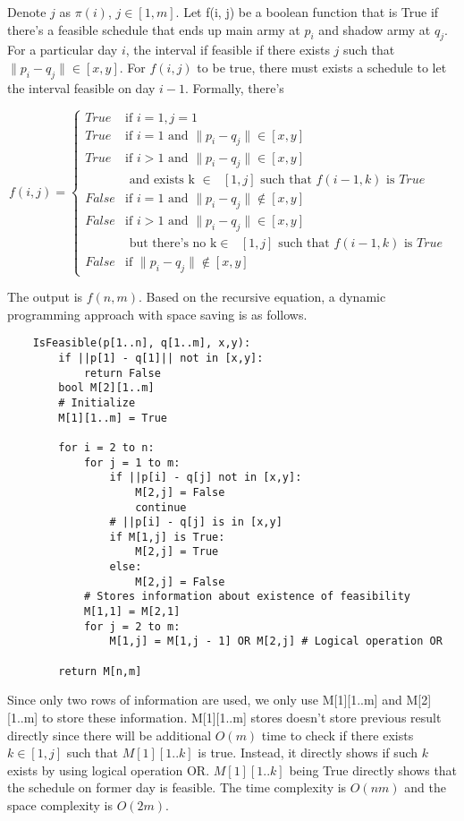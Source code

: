 \documentclass[12pt,a4paper]{article}
\newcommand{\question}[1]{\bigskip\noindent{\textbf{Q{#1} solution}}}
\begin{document}
\question{21.A}

Denote $j$ as $\pi(i)$, $j \in [1,m]$. Let f(i, j) be a boolean function that is True if there's a feasible schedule that ends up main army at $p_i$ and shadow army at $q_j$. For a particular day $i$, the interval if feasible if there exists $j$ such that $\|p_i - q_j\| \in [x,y]$. For $f(i,j)$ to be true, there must exists a schedule to let the interval feasible on day $i - 1$. Formally, there's 

\begin{equation*}
f(i, j) = 
	\begin{cases}
	True & \mbox{if } i = 1, j = 1 \\
	True & \mbox{if } i = 1 \mbox{ and } \|p_i - q_j\| \in [x,y] \\
	True & \mbox{if } i > 1 \mbox{ and }\|p_i - q_j\| \in [x,y] \\
		& \mbox{ and exists k $\in$ $[1,j]$ such that $f(i - 1, k)$ is $True$} \\
	False & \mbox{if } i = 1 \mbox{ and } \|p_i - q_j\| \notin [x,y] \\
	False & \mbox{if }  i > 1 \mbox{ and } \|p_i - q_j\| \in [x,y] \\
		& \mbox{ but there's no k$\in$ $[1,j]$ such that $f(i - 1, k)$ is $True$ } \\
	False & \mbox{if } \|p_i - q_j\| \notin [x,y]
	\end{cases}
\end{equation*}

The output is $f(n, m)$. Based on the recursive equation, a dynamic programming approach with space saving is as follows.

\begin{lstlisting}
	IsFeasible(p[1..n], q[1..m], x,y):
		if ||p[1] - q[1]|| not in [x,y]:
			return False
		bool M[2][1..m] 
		# Initialize
		M[1][1..m] = True

		for i = 2 to n:
			for j = 1 to m:
				if ||p[i] - q[j] not in [x,y]:
					M[2,j] = False
					continue
				# ||p[i] - q[j] is in [x,y]
				if M[1,j] is True:
					M[2,j] = True
				else:
					M[2,j] = False
			# Stores information about existence of feasibility
			M[1,1] = M[2,1]
			for j = 2 to m:
				M[1,j] = M[1,j - 1] OR M[2,j] # Logical operation OR

		return M[n,m]	
\end{lstlisting}

Since only two rows of information are used, we only use M[1][1..m] and M[2][1..m] to store these information. M[1][1..m] stores doesn't store previous result directly since there will be additional $O(m)$ time to check if there exists $k \in [1,j]$ such that $M[1][1..k]$ is true. Instead, it directly shows if such $k$ exists by using logical operation OR. $M[1][1..k]$ being True directly shows that the schedule on former day is feasible. The time complexity is $O(nm)$ and the space complexity is $O(2m)$.
\end{document}
